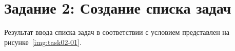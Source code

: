 \section{Задание 2: Создание списка задач}

Результат ввода списка задач в соответствии с условием представлен на
рисунке~\ref{img:task02-01}.


